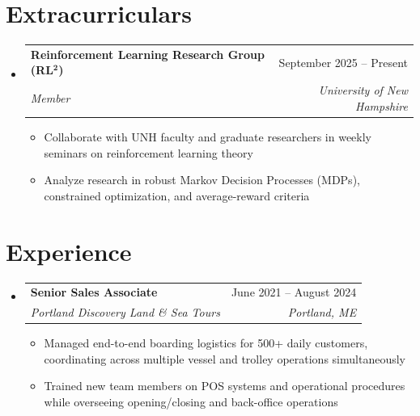 \documentclass[letterpaper,11pt]{article}
\makeatletter
\newcommand{\resumeItem}[1]{
  \item\small{
    {#1 \vspace{-2pt}}
  }
}
\newcommand{\resumeSubheading}[4]{
  \vspace{-2pt}\item
    \begin{tabular*}{0.97\textwidth}[t]{l@{\extracolsep{\fill}}r}
      \textbf{#1} & #2 \\
      \textit{\small#3} & \textit{\small #4} \\
    \end{tabular*}\vspace{-7pt}
}
\newcommand{\resumeSubHeadingListStart}{\begin{itemize}[leftmargin=0.15in, label={}]}
\newcommand{\resumeSubHeadingListEnd}{\end{itemize}}
\newcommand{\resumeItemListStart}{\begin{itemize}}
\newcommand{\resumeItemListEnd}{\end{itemize}\vspace{-5pt}}
\makeatother
\begin{document}
\section{Extracurriculars}
    \resumeSubHeadingListStart
        \resumeSubheading{Reinforcement Learning Research Group (RL$\mathbf{^2}$)}{September 2025 -- Present}{Member}{University of New Hampshire}
            \resumeItemListStart
                \resumeItem{Collaborate with UNH faculty and graduate researchers in weekly seminars on reinforcement learning theory}
                \resumeItem{Analyze research in robust Markov Decision Processes (MDPs), constrained optimization, and average-reward criteria}
            \resumeItemListEnd
    \resumeSubHeadingListEnd

\section{Experience}
  \resumeSubHeadingListStart
    \resumeSubheading
      {Senior Sales Associate}{June 2021 -- August 2024}
      {Portland Discovery Land \& Sea Tours}{Portland, ME}
      \resumeItemListStart
        \resumeItem{Managed end-to-end boarding logistics for 500+ daily customers, coordinating across multiple vessel and trolley operations simultaneously}
        \resumeItem{Trained new team members on POS systems and operational procedures while overseeing opening/closing and back-office operations}
      \resumeItemListEnd
  \resumeSubHeadingListEnd

\end{document}
